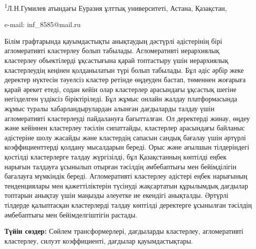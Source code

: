\begin{affiliation}
\textsuperscript{1}Л.Н.Гумилев атындағы Еуразия ұлттық университеті,
Астана, Қазақстан,

e-mail: inf\_8585@mail.ru
\end{affiliation}

Білім графтарында қауымдастықты анықтаудың дәстүрлі әдістерінің бірі
агломеративті кластерлеу болып табылады. Агломеративті иерархиялық
кластерлеу объектілерді ұқсастығына қарай топтастыру үшін иерархиялық
кластерлеудің кеңінен қолданылатын түрі болып табылады. Бұл әдіс әрбір
жеке деректер нүктесін тәуелсіз кластер ретінде өңдеуден бастап,
төменнен жоғарыға қарай әрекет етеді, содан кейін олар кластерлер
арасындағы ұқсастық шегіне негізделген үздіксіз біріктіріледі. Бұл жұмыс
онлайн жалдау платформасында жұмыс туралы хабарландырулардан алынған
дағдыларды талдау үшін агломеративті кластерлеуді пайдалануға
бағытталған. Ол деректерді жинау, өңдеу және кейіннен кластерлеу тәсілін
сипаттайды, кластерлер арасындағы байланыс әдістеріне шолу жасайды және
кластердің сапасын сандық бағалау үшін әртүрлі коэффициенттерді қолдану
мысалдарын береді. Орыс және ағылшын тілдеріндегі қостілді кластерлерге
талдау жүргізілді, бұл Қазақстанның көптілді еңбек нарығын талдауға
ұсынылып отырған тәсілдің әмбебаптығы мен бейімділігін бағалауға
мүмкіндік береді. Агломеративті кластерлеу әдістері еңбек нарығының
тенденциялары мен қажеттіліктерін түсінуді жақсартатын құрылымдық
дағдылар топтарын анықтау үшін маңызды әлеуетке ие екендігі анықталды.
Әртүрлі тілдерде қалыптасқан кластерлерді талдау көптілді деректерге
ұсынылған тәсілдің әмбебаптығы мен бейімделгіштігін растады.

{\bfseries Түйін сөздер:} Сөйлем трансформерлері, дағдыларды кластерлеу,
агломеративті кластерлеу, силуэт коэффициенті, дағдылар қауымдастықтары.

